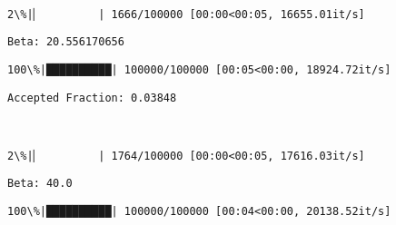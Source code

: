 \documentclass[11pt]{article}
\begin{document}
    \begin{center}
    \end{center}
    { \hspace*{\fill} \\}
    
    \begin{Verbatim}[commandchars=\\\{\}]
  2\%|▏         | 1666/100000 [00:00<00:05, 16655.01it/s]
    \end{Verbatim}

    \begin{Verbatim}[commandchars=\\\{\}]
Beta: 20.556170656

    \end{Verbatim}

    \begin{Verbatim}[commandchars=\\\{\}]
100\%|██████████| 100000/100000 [00:05<00:00, 18924.72it/s]

    \end{Verbatim}

    \begin{Verbatim}[commandchars=\\\{\}]
Accepted Fraction: 0.03848

    \end{Verbatim}

    \begin{center}
    \end{center}
    { \hspace*{\fill} \\}
    
    \begin{Verbatim}[commandchars=\\\{\}]
  2\%|▏         | 1764/100000 [00:00<00:05, 17616.03it/s]
    \end{Verbatim}

    \begin{Verbatim}[commandchars=\\\{\}]
Beta: 40.0

    \end{Verbatim}

    \begin{Verbatim}[commandchars=\\\{\}]
100\%|██████████| 100000/100000 [00:04<00:00, 20138.52it/s]

    \end{Verbatim}
\end{document}
